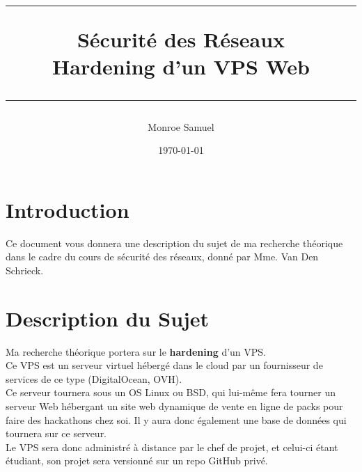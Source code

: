 \documentclass[a4paper,10pt,final,fleqn]{article}
\title{
\parbox{15cm}
{ %
  \vspace{3cm}
	\begin{center}\sf\bfseries\Huge
		\rule{15cm}{1pt}
		\medskip
		Sécurité des Réseaux \\
		\huge Hardening d'un VPS Web
		\vspace{.5cm}
		\rule{15cm}{1pt}
	\end{center}
	\vspace{3cm}
 }}
\author{Monroe Samuel}
\date{\today}
\begin{document}
\maketitle
\newpage

	\section{Introduction}

		Ce document vous donnera une description du sujet de ma recherche théorique dans le cadre du cours de sécurité des réseaux, donné par Mme. Van Den Schrieck.\\

	\section{Description du Sujet}

		Ma recherche théorique portera sur le \textbf{hardening} d'un VPS.\\

		Ce VPS est un serveur virtuel hébergé dans le cloud par un fournisseur de services de ce type (DigitalOcean, OVH).\\
		Ce serveur tournera sous un OS Linux ou BSD, qui lui-même fera tourner un serveur Web hébergant un site web dynamique de vente en ligne de packs pour faire des hackathons chez soi. Il y aura donc également une base de données qui tournera sur ce serveur.\\

		Le VPS sera donc administré à distance par le chef de projet, et celui-ci étant étudiant, son projet sera versionné sur un repo GitHub privé.\\
\end{document}
